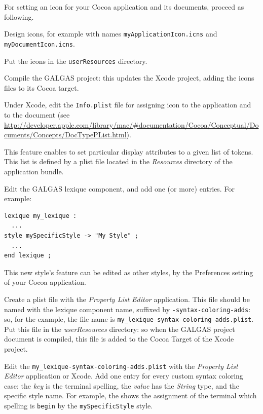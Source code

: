 For setting an icon for your Cocoa application and its documents, proceed as following.



 Design icons, for example with names \texttt{myApplicationIcon.icns} and \texttt{myDocumentIcon.icns}.

 Put the icons in the \texttt{userResources} directory.

 Compile the GALGAS project: this updates the Xcode project, adding the icons files to its Cocoa target.

 Under Xcode, edit the \texttt{Info.plist} file for assigning icon to the application and to the document (see \url{http://developer.apple.com/library/mac/#documentation/Cocoa/Conceptual/Documents/Concepts/DocTypePList.html}).












This feature enables to set particular display attributes to a given list of tokens. This list is defined by a plist file located in the \emph{Resources} directory of the application bundle.

 Edit the GALGAS lexique component, and add one (or more)  entries. For example:

\begin{lstlisting}[language=galgas]
lexique my_lexique :
  ...
style mySpecificStyle -> "My Style" ;
  ...
end lexique ;
\end{lstlisting}

This new style's feature can be edited as other styles, by the Preferences setting of your Cocoa application.


 Create a plist file with the \emph{Property List Editor} application. This file should be named with the lexique component name, suffixed by \texttt{-syntax-coloring-adds}: so, for the example, the file name is \texttt{my\_lexique-syntax-coloring-adds.plist}. Put this file in the \emph{userResources} directory: so when the GALGAS project document is compiled, this file is added to the Cocoa Target of the Xcode project. 

 Edit the \texttt{my\_lexique-syntax-coloring-adds.plist} with the \emph{Property List Editor} application or Xcode. Add one entry for every custom syntax coloring case: the \emph{key} is the terminal spelling, the \emph{value} has the \emph{String} type, and the specific style name. For example, the  shows the assignment of the terminal which spelling is \texttt{begin} by the \texttt{mySpecificStyle} style.

